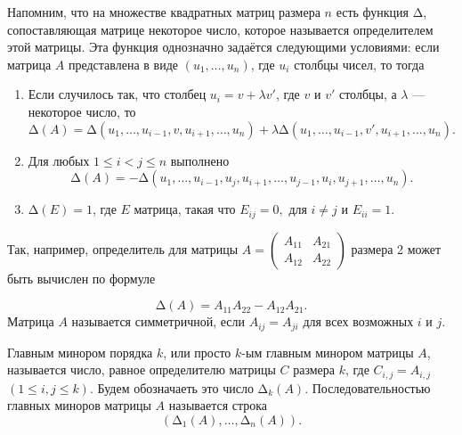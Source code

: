 \def\mb#1{\mathbb{#1}}
\def\ol#1{\overline{#1}}
\def\tbf#1{\textbf{#1}}

Напомним, что на множестве квадратных матриц размера $n$ есть функция $\text{Δ}$, сопоставляющая матрице некоторое число, которое называется определителем этой матрицы.
Эта функция однозначно задаётся следующими условиями:
если матрица $A$ представлена в виде $(u_1, \dots, u_n)$, где $u_i$ столбцы чисел, то тогда

\begin{enumerate}
\item  Если случилось так, что столбец $u_i=v + \lambda v'$, где $v$ и $v'$ столбцы, а $\lambda$ --- некоторое число, то
$$\text{Δ}(A)=\text{Δ}(u_1, \dots, u_{i-1}, v, u_{i+1}, \dots, u_n) + \lambda\text{Δ}(u_1, \dots, u_{i-1}, v', u_{i+1}, \dots, u_n).$$
\item  Для любых $1\leq i<j\leq n$ выполнено
$$\text{Δ}(A)=-\text{Δ}(u_1, \dots, u_{i-1}, u_j, u_{i+1}, \dots, u_{j-1}, u_{i}, u_{j+1}, \dots, u_n).$$
\item  $\text{Δ}(E)=1$, где $E$ матрица, такая что $E_{ij}=0, $ для $i\neq j$ и $E_{ii}=1$.
\end{enumerate}
Так, например, определитель для матрицы $A=\left(\begin{smallmatrix}A_{11} & A_{21}\\ A_{12} & A_{22}\end{smallmatrix}\right)$ размера 2 может быть вычислен по формуле

$$\text{Δ}(A)= A_{11}A_{22}-A_{12}A_{21} .$$
Матрица $A$ называется симметричной, если $A_{i j}=A_{j i}$ для всех возможных $i$ и $j$.

Главным минором порядка $k$, или просто $k$-ым главным минором матрицы $A$, называется число, равное определителю матрицы $C$ размера $k$, где $C_{i, j}= A_{i, j}$ $(1 \leq i, j \leq k)$. Будем обозначаеть это число $\text{Δ}_k(A)$. Последовательностью главных миноров матрицы $A$ называется строка
$$(\text{Δ}_1(A), \dots , \text{Δ}_n(A)).$$


